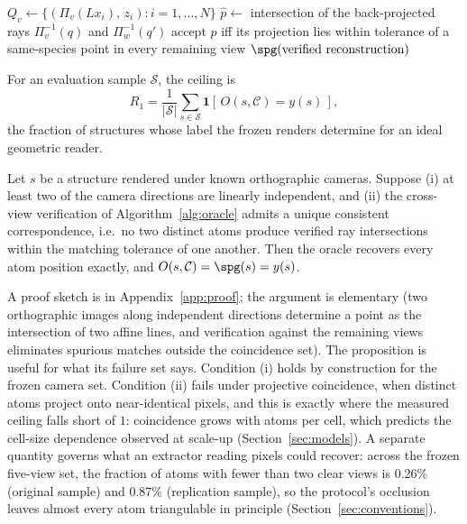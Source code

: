 \begin{algorithm}[t]
\caption{Geometric oracle $O(s, \mathcal{C})$}
\label{alg:oracle}
\begin{algorithmic}[1]
  \State $Q_v \gets \{(\Pi_v(L x_i),\, z_i) : i = 1,\dots,N\}$
\EndFor
{}
  \State $\hat{p} \gets$ intersection of the back-projected rays $\Pi_v^{-1}(q)$ and $\Pi_w^{-1}(q')$
  \State accept $\hat{p}$ iff its projection lies within tolerance of a same-species point in every
         remaining view
\EndFor
\State \Return $\spg(\text{verified reconstruction})$
\end{algorithmic}
\end{algorithm}

\begin{definition}
\label{def:ceiling}
For an evaluation sample $\mathcal{S}$, the ceiling is
\[
R_1 = \frac{1}{|\mathcal{S}|}\sum_{s \in \mathcal{S}} \mathbf{1}\!\left[\,O(s,\mathcal{C}) = y(s)\,\right],
\]
the fraction of structures whose label the frozen renders determine for an ideal geometric reader.
\end{definition}

\begin{proposition}
\label{prop:ident}
Let $s$ be a structure rendered under known orthographic cameras. Suppose (i) at least two of the camera
directions are linearly independent, and (ii) the cross-view verification of
Algorithm~\ref{alg:oracle} admits a unique consistent correspondence, i.e.\ no two distinct atoms produce
verified ray intersections within the matching tolerance of one another. Then the oracle recovers every
atom position exactly, and $O(s, \mathcal{C}) = \spg(s) = y(s)$.
\end{proposition}

A proof sketch is in Appendix~\ref{app:proof}; the argument is elementary (two orthographic images along
independent directions determine a point as the intersection of two affine lines, and verification against
the remaining views eliminates spurious matches outside the coincidence set). The proposition is useful for
what its failure set says. Condition (i) holds by construction for the frozen camera set. Condition
(ii) fails under projective coincidence, when distinct atoms project onto near-identical pixels, and this
is exactly where the measured ceiling falls short of $1$: coincidence grows with atoms per cell, which
predicts the cell-size dependence observed at scale-up (Section~\ref{sec:models}). A separate quantity
governs what an extractor reading pixels could recover: across the frozen five-view set, the fraction of
atoms with fewer than two clear views is 0.26\% (original sample) and 0.87\% (replication sample), so the
protocol's occlusion leaves almost every atom triangulable in principle (Section~\ref{sec:conventions}).

